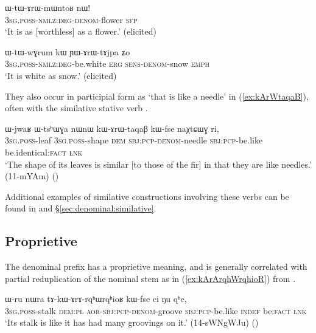 \begin{exe}
\ex \label{ex:WtArWmWntoR}
\gll ɯ-tɯ-ɤrɯ-mɯntoʁ nɯ! \\
\textsc{3sg}.\textsc{poss}-\textsc{nmlz}:\textsc{deg}-\textsc{denom}-flower \textsc{sfp} \\
\glt `It is as [worthless] as a flower.' (elicited)
\end{exe}

 \begin{exe}
\ex \label{ex:YArWtAjpa}
\gll ɯ-tɯ-wɣrum kɯ ɲɯ-ɤrɯ-tɤjpa ʑo \\
\textsc{3sg}.\textsc{poss}-\textsc{nmlz}:\textsc{deg}-be.white \textsc{erg} \textsc{sens}-\textsc{denom}-snow \textsc{emph} \\
\glt `It is white as snow.' (elicited)
\end{exe}

They also occur in participial form as  `that is like a needle' in (\ref{ex:kArWtaqaB}), often with the similative stative verb .

\begin{exe}
\ex \label{ex:kArWtaqaB}
\gll ɯ-jwaʁ ɯ-tsʰɯɣa nɯnɯ kɯ-ɤrɯ-taqaβ kɯ-fse naχtɕɯɣ ri, \\
\textsc{3sg}.\textsc{poss}-leaf \textsc{3sg}.\textsc{poss}-shape \textsc{dem} \textsc{sbj}:\textsc{pcp}-\textsc{denom}-needle \textsc{sbj}:\textsc{pcp}-be.like be.identical:\textsc{fact} \textsc{lnk} \\
\glt `The shape of its leaves is similar [to those of the fir] in that they are like needles.' (11-mYAm) ()
\end{exe}

Additional examples of similative constructions involving these verbs can be found in  \citet{jacques18similative} and §\ref{sec:denominal:similative}.

\subsection{Proprietive  }  \label{sec:denom.arA}
The  denominal prefix has a proprietive meaning, and is generally correlated with partial reduplication of the nominal stem as in  (\ref{ex:kArArqhWrqhioR}) from .


\begin{exe}
\ex \label{ex:kArArqhWrqhioR}
\gll ɯ-ru nɯra tɤ-kɯ-ɤrɤ-rqʰɯ\redp{}rqʰioʁ kɯ-fse ci ŋu qʰe, \\
\textsc{3sg}.\textsc{poss}-stalk \textsc{dem}:\textsc{pl} \textsc{aor}-\textsc{sbj}:\textsc{pcp}-\textsc{denom}-groove \textsc{sbj}:\textsc{pcp}-be.like \textsc{indef} be:\textsc{fact} \textsc{lnk} \\
\glt `Its stalk is like it has had many groovings on it.' (14-sWNgWJu) ()
\end{exe}

